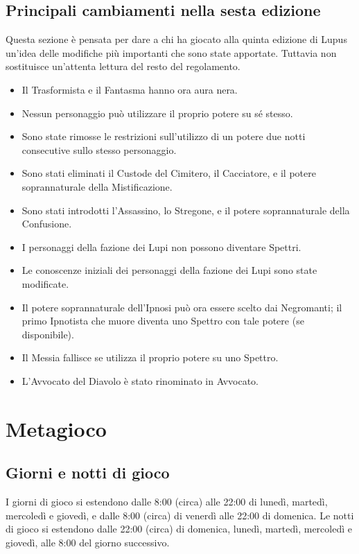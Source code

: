 \documentclass[a4paper,10pt]{article}
\begin{document}
\subsection{Principali cambiamenti nella sesta edizione}

Questa sezione è pensata per dare a chi ha giocato alla quinta edizione di Lupus un'idea delle modifiche più importanti che sono state apportate. Tuttavia non sostituisce un'attenta lettura del resto del regolamento.

\begin{itemize}
  \item Il Trasformista e il Fantasma hanno ora aura nera.
  \item Nessun personaggio può utilizzare il proprio potere su sé stesso.
  \item Sono state rimosse le restrizioni sull'utilizzo di un potere due notti consecutive sullo stesso personaggio.
  \item Sono stati eliminati il Custode del Cimitero, il Cacciatore, e il potere soprannaturale della Mistificazione.
  \item Sono stati introdotti l'Assassino, lo Stregone, e il potere soprannaturale della Confusione.
  \item I personaggi della fazione dei Lupi non possono diventare Spettri.
  \item Le conoscenze iniziali dei personaggi della fazione dei Lupi sono state modificate.
  \item Il potere soprannaturale dell'Ipnosi può ora essere scelto dai Negromanti; il primo Ipnotista che muore diventa uno Spettro con tale potere (se disponibile).
  \item Il Messia fallisce se utilizza il proprio potere su uno Spettro.
  \item L'Avvocato del Diavolo è stato rinominato in Avvocato.
\end{itemize}




\pagebreak
\section{Metagioco}

\subsection{Giorni e notti di gioco}

I giorni di gioco si estendono dalle 8:00 (circa) alle 22:00 di lunedì, martedì, mercoledì e giovedì, e dalle 8:00 (circa) di venerdì alle 22:00 di domenica. Le notti di gioco si estendono dalle 22:00 (circa) di domenica, lunedì, martedì, mercoledì e giovedì, alle 8:00 del giorno successivo.
\end{document}

